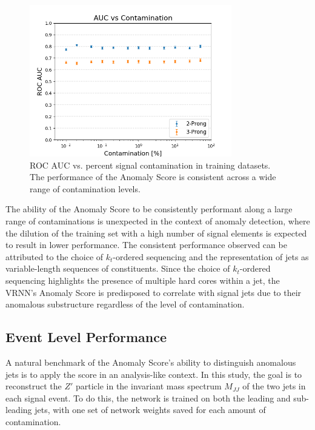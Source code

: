 \documentclass[11pt, a4paper]{article}
\begin{document}
\begin{figure}[H]
	\begin{center}
		\includegraphics[width=250pt]{imgs/bugfix/AUC_vs_Contam_Lead_SaveForPaper.png}
	\end{center}
	\caption{ROC AUC vs. percent signal contamination in training datasets. The performance of the Anomaly Score is consistent across a wide range of contamination levels.}
	\label{fig:aucs_vs_contam}
\end{figure}


The ability of the Anomaly Score to be consistently performant along a large range of contaminations is unexpected in the context of anomaly detection, where the dilution of the training set with a high number of signal elements is expected to result in lower performance.
The consistent performance observed can be attributed to the choice of $k_t$-ordered sequencing and the representation of jets as variable-length sequences of constituents. Since the choice of $k_t$-ordered sequencing highlights the presence of multiple hard cores within a jet, the VRNN's Anomaly Score is predisposed to correlate with signal jets due to their anomalous substructure regardless of the level of contamination.




\subsection{Event Level Performance}


A natural benchmark of the Anomaly Score's ability to distinguish anomalous jets is to apply the score in an analysis-like context. In this study, the goal is to reconstruct the $Z'$ particle in the invariant mass spectrum $M_{JJ}$ of the two jets in each signal event. To do this, the network is trained on both the leading and sub-leading jets, with one set of network weights saved for each amount of contamination. 
\end{document}
